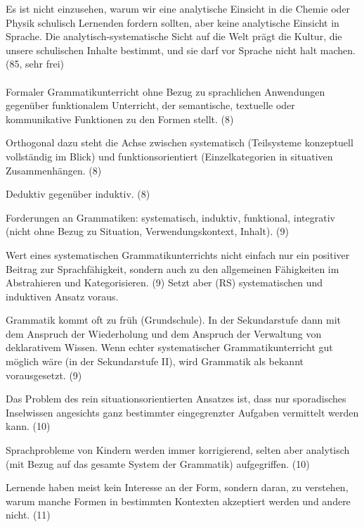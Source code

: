 Es ist nicht einzusehen, warum wir eine analytische Einsicht in die Chemie oder Physik schulisch Lernenden fordern sollten, aber keine analytische Einsicht in Sprache.
Die analytisch-systematische Sicht auf die Welt prägt die Kultur, die unsere schulischen Inhalte bestimmt, und sie darf vor Sprache nicht halt machen. (85, sehr frei)


\paragraph{\citet{Menzel2017}}

Formaler Grammatikunterricht ohne Bezug zu sprachlichen Anwendungen gegenüber funktionalem Unterricht, der semantische, textuelle oder kommunikative Funktionen zu den Formen stellt. (8)

Orthogonal dazu steht die Achse zwischen systematisch (Teilsysteme konzeptuell vollständig im Blick) und funktionsorientiert (Einzelkategorien in situativen Zusammenhängen. (8)

Deduktiv gegenüber induktiv. (8)

Forderungen an Grammatiken: systematisch, induktiv, funktional, integrativ (nicht ohne Bezug zu Situation, Verwendungskontext, Inhalt). (9)

Wert eines systematischen Grammatikunterrichts nicht einfach nur ein positiver Beitrag zur Sprachfähigkeit, sondern auch zu den allgemeinen Fähigkeiten im Abstrahieren und Kategorisieren. (9) Setzt aber (RS) systematischen und induktiven Ansatz voraus.

Grammatik kommt oft zu früh (Grundschule).
In der Sekundarstufe dann mit dem Anspruch der Wiederholung und dem Anspruch der Verwaltung von deklarativem Wissen.
Wenn echter systematischer Grammatikunterricht gut möglich wäre (in der Sekundarstufe II), wird Grammatik als bekannt vorausgesetzt. (9)

Das Problem des rein situationsorientierten Ansatzes ist, dass nur sporadisches Inselwissen angesichts ganz bestimmter eingegrenzter Aufgaben vermittelt werden kann. (10)

Sprachprobleme von Kindern werden immer korrigierend, selten aber analytisch (mit Bezug auf das gesamte System der Grammatik) aufgegriffen. (10)

Lernende haben meist kein Interesse an der Form, sondern daran, zu verstehen, warum manche Formen in bestimmten Kontexten akzeptiert werden und andere nicht. (11)

